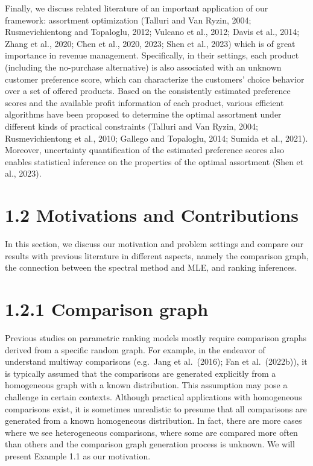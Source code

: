 Finally, we discuss related literature of an important application of our framework: assortment optimization (Talluri and Van Ryzin, 2004; Rusmevichientong and Topaloglu, 2012; Vulcano et al., 2012; Davis et al., 2014; Zhang et al., 2020; Chen et al., 2020, 2023; Shen et al., 2023) which is of great importance in revenue management. Specifically, in their settings, each product (including the no-purchase alternative) is also associated with an unknown customer preference score, which can characterize the customers' choice behavior over a set of offered products. Based on the consistently estimated preference scores and the available profit information of each product, various efficient algorithms have been proposed to determine the optimal assortment under different kinds of practical constraints (Talluri and Van Ryzin, 2004; Rusmevichientong et al., 2010; Gallego and Topaloglu, 2014; Sumida et al., 2021). Moreover, uncertainty quantification of the estimated preference scores also enables statistical inference on the properties of the optimal assortment (Shen et al., 2023).

\section{1.2 Motivations and Contributions}\label{motivations-and-contributions}

In this section, we discuss our motivation and problem settings and compare our results with previous literature in different aspects, namely the comparison graph, the connection between the spectral method and MLE, and ranking inferences.

\section{1.2.1 Comparison graph}\label{comparison-graph}

Previous studies on parametric ranking models mostly require comparison graphs derived from a specific random graph. For example, in the endeavor of understand multiway comparisons (e.g.~Jang et al.~(2016); Fan et al.~(2022b)), it is typically assumed that the comparisons are generated explicitly from a homogeneous graph with a known distribution. This assumption may pose a challenge in certain contexts. Although practical applications with homogeneous comparisons exist, it is sometimes unrealistic to presume that all comparisons are generated from a known homogeneous distribution. In fact, there are more cases where we see heterogeneous comparisons, where some are compared more often than others and the comparison graph generation process is unknown. We will present Example 1.1 as our motivation.

